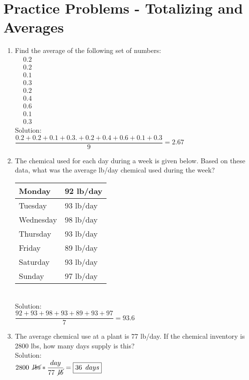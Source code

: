 \section*{Practice Problems - Totalizing and Averages}
\begin{enumerate}
\item Find the average of the following set of numbers:\\
$
\begin{aligned}
&0.2 \\
&0.2 \\
&0.1 \\
&0.3 \\
&0.2 \\
&0.4 \\
&0.6 \\
&0.1 \\
&0.3
\end{aligned}$\\
\vspace{0.2cm}
Solution:\\
\vspace{0.2cm}
$\dfrac{0.2+0.2+0.1+0.3.+0.2+0.4+0.6+0.1+0.3}{9}=\boxed{2.67}$
\vspace{0.2cm}
\item The chemical used for each day during a week is given below. Based on these data, what was the average lb/day chemical used during the week?\\

\begin{tabular}{|l|l|}
\hline
Monday & 92 lb/day\\
\hline
Tuesday & 93 lb/day \\
\hline
Wednesday & 98 lb/day\\
\hline
Thursday & 93 lb/day \\
\hline
Friday & 89 lb/day\\
\hline
Saturday & 93 lb/day \\
\hline
Sunday & 97 lb/day\\
\hline
\end{tabular}\\
\vspace{0.3cm}
Solution:\\
\vspace{0.2cm}
$\dfrac{92+93+98+93+89+93+97}{7}=\boxed{93.6}$
\vspace{0.2cm}
\item The average chemical use at a plant is 77 lb/day. If the chemical inventory is 2800 lbs, how many days supply is this?\\
Solution:\\
$2800 \enspace \cancel{lbs} * \dfrac{day}{77 \enspace \cancel{lb}}=\boxed{36 \enspace days}$
\end{enumerate}

